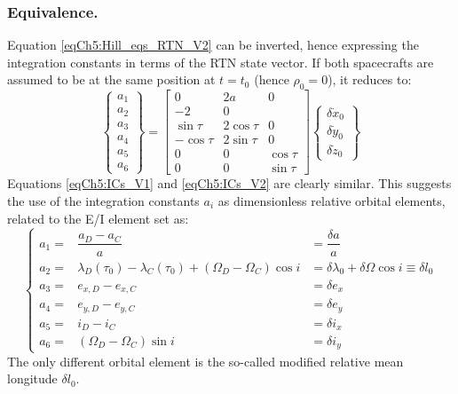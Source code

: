 		\subsubsection{Equivalence.}
		\indent Equation \eqref{eqCh5:Hill_eqs_RTN_V2} can be inverted, hence expressing the integration constants in terms of the RTN state vector. If both spacecrafts are assumed to be at the same position at $t = t_0$ (hence $\rho_0 = 0$), it reduces to:
		\begin{equation}
		\left\{
		\begin{array}{c}
		a_1\\
		a_2\\
		a_3\\
		a_4\\
		a_5\\
		a_6
		\end{array}\right\} 
		= 
		\left[\begin{array}{cccc}
		0 & 2 a & 0 \\
		-2 & 0 &  \\
		\sin \tau & 2 \cos \tau & 0 \\
		-\cos \tau & 2 \sin \tau & 0 \\
		0 & 0 & \cos \tau \\
		0 & 0 & \sin \tau
		\end{array}\right] 
		\left\{\begin{array}{c}
		\delta \dot{x}_0 \\
		\delta \dot{y}_0 \\
		\delta \dot{z}_0
		\end{array}\right\}
		\label{eqCh5:ICs_V2}
		\end{equation}
		\indent Equations \eqref{eqCh5:ICs_V1} and \eqref{eqCh5:ICs_V2} are clearly similar. This suggests the use of the integration constants $a_i$ as dimensionless relative orbital elements, related to the E/I element set as:
		\begin{equation}
		\left\{ \begin{array}{lll}
		a_1 = & \dfrac{a_D - a_C}{a} & = \dfrac{\delta a}{a}\\
		a_2 = & \lambda_D(\tau_0) - \lambda_C (\tau_0)  + \left( \Omega_D - \Omega_C  \right) \cos i & = \delta \lambda_0 + \delta \Omega \cos i \equiv \delta l_0 \\
		a_3 = & e_{x, D} - e_{x, C} & = \delta e_x \\
		a_4 = & e_{y, D} - e_{y, C} & = \delta e_y \\
		a_5 = & i_D - i_C & = \delta i_x\\
		a_6 = & \left( \Omega_D - \Omega_C \right) \sin i & = \delta i_y
		\end{array}\right.
		\end{equation}
		\indent The only different orbital element is the so-called modified relative mean longitude $\delta l_0$. 
